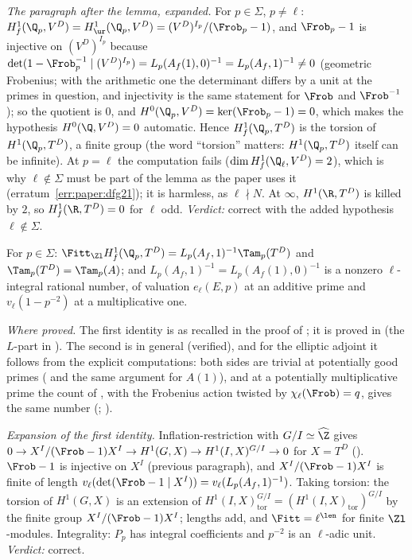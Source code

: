\begin{sloppypar}
\emph{The paragraph after the lemma, expanded.} For $p\in\Sigma$, $p\ne\ell$: $H^1_f(\Q_p,V^D)=H^1_{\ur}(\Q_p,V^D)=(V^D)^{I_p}/(\Frob_p-1)$, and $\Frob_p-1$ is injective on $(V^D)^{I_p}$ because
$\det(1-\Frob_p^{-1}\mid(V^D)^{I_p})=L_p(A_f(1),0)^{-1}=L_p(A_f,1)^{-1}\ne0$ (geometric Frobenius; with the arithmetic one the determinant differs by a unit at the primes in question, and
injectivity is the same statement for $\Frob$ and $\Frob^{-1}$); so the quotient is $0$, and $H^0(\Q_p,V^D)=\ker(\Frob_p-1)=0$, which makes the hypothesis $H^0(\Q,V^D)=0$ automatic.
Hence $H^1_f(\Q_p,T^D)$ is the torsion of $H^1(\Q_p,T^D)$, a finite group (the word ``torsion'' matters: $H^1(\Q_p,T^D)$ itself can be infinite). At $p=\ell$ the computation fails
($\dim H^1_f(\Q_\ell,V^D)=2$), which is why $\ell\notin\Sigma$ must be part of the lemma as the paper uses it (erratum~\ref{err:paper:dfg21}); it is harmless, as $\ell\nmid N$. At $\infty$, $H^1(\R,T^D)$
is killed by $2$, so $H^1_f(\R,T^D)=0$ for $\ell$ odd. \emph{Verdict:} correct with the added hypothesis $\ell\notin\Sigma$.

\begin{lemma}\label{lem:paper:fpr}
For $p\in\Sigma$: $\Fitt_{\Zl}H^1_f(\Q_p,T^D)=L_p(A_f,1)^{-1}\Tam_p(T^D)$ and $\Tam_p(T^D)=\Tam_p(A)$; and $L_p(A_f,1)^{-1}=L_p(A_f(1),0)^{-1}$ is a nonzero $\ell$-integral rational number, of
valuation $e_\ell(E,p)$ at an additive prime and $v_\ell(1-p^{-2})$ at a multiplicative one.
\end{lemma}

\noindent\emph{Where proved.} The first identity is \cite[I.4.2.2]{FPR94} as recalled in the proof of \cite[Theorem 2.15]{DFG04}; it is proved in  (the
$L$-part in ). The second is \cite[(57)]{DFG04} in general (verified), and for the elliptic adjoint it follows from the explicit computations: both sides are
trivial at potentially good primes ( and the same argument for $A(1)$), and at a potentially multiplicative prime the count of , with
the Frobenius action twisted by $\chi_\ell(\Frob)=q$, gives the same number (; ).

\emph{Expansion of the first identity.} Inflation-restriction with $G/I\simeq\widehat\Z$ gives $0\to X^I/(\Frob-1)X^I\to H^1(G,X)\to H^1(I,X)^{G/I}\to0$ for $X=T^D$ (). $\Frob-1$ is
injective on $X^I$ (previous paragraph), and $X^I/(\Frob-1)X^I$ is finite of length $v_\ell(\det(\Frob-1\mid X^I))=v_\ell(L_p(A_f,1)^{-1})$. Taking torsion: the torsion of $H^1(G,X)$ is an
extension of $H^1(I,X)^{G/I}_{\mathrm{tor}}=(H^1(I,X)_{\mathrm{tor}})^{G/I}$ by the finite group $X^I/(\Frob-1)X^I$; lengths add, and $\Fitt=\ell^{\len}$ for finite $\Zl$-modules. Integrality: $P_p$ has
integral coefficients and $p^{-2}$ is an $\ell$-adic unit. \emph{Verdict:} correct.


\end{sloppypar}
